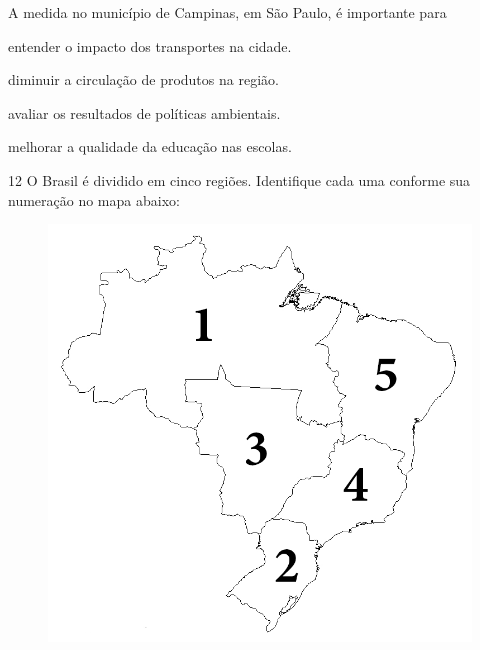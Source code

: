 
A medida no município de Campinas, em São Paulo, é
importante para

\begin{escolha}
\item entender o impacto dos transportes na cidade.

\item diminuir a circulação de produtos na região.

\item avaliar os resultados de políticas ambientais.

\item melhorar a qualidade da educação nas escolas.
\end{escolha}



\pagebreak
\num{12} O Brasil é dividido em cinco regiões. Identifique cada uma conforme sua numeração no mapa abaixo:

\begin{figure}[htpb!]
\includegraphics[width=\textwidth]{../ilustracoes/CHU5/SAEB_5ANO_CHU_FIGURA1.png}
\end{figure}



